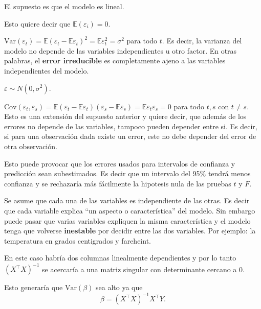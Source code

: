 \documentclass[
  12pt,
]{book}
\providecommand{\tightlist}{%
  \setlength{\itemsep}{0pt}\setlength{\parskip}{0pt}}
\theoremstyle{definition}
\theoremstyle{definition}
\theoremstyle{definition}
\theoremstyle{remark}
\begin{document}
\begin{description}
\tightlist
\item[Independencia lineal]
El supuesto es que el modelo es lineal.
\item[Errores con esperanza nula]
Esto quiere decir que \(\mathbb{E}(\varepsilon_i) = 0\).
\item[Homocedasticidad]
\(\text{Var}(\varepsilon_t) = \mathbb{E}(\varepsilon_t - \mathbb{E} \varepsilon_t)^2 = \mathbb{E} \varepsilon_t^2 = \sigma^2\) para todo \(t\). Es decir, la varianza del modelo no depende de las variables independientes u otro factor. En otras palabras, el \textbf{error irreducible} es completamente ajeno a las variables independientes del modelo.
\item[Normalidad de los residuos]
\(\varepsilon \sim N(0, \sigma^2 )\).
\item[Independencia de los erroes]
\(\text{Cov}(\varepsilon_t,\varepsilon_s ) = \mathbb{E} (\varepsilon_t - \mathbb{E} \varepsilon_t) (\varepsilon_s - \mathbb{E} \varepsilon_s) = \mathbb{E} \varepsilon_t \varepsilon_s = 0\) para todo \(t,s\) con \(t\neq s\). Esto es una extensión del supuesto anterior y quiere decir, que además de los errores no depende de las variables, tampoco pueden depender entre si. Es decir, si para una observación dada existe un error, este no debe depender del error de otra observación.
\end{description}

Esto puede provocar que los errores usados para intervalos de confianza y predicción sean subestimados. Es decir que un intervalo del 95\% tendrá menos confianza y se rechazaría más fácilmente la hipotesis nula de las pruebas \(t\) y \(F\).

\begin{description}
\tightlist
\item[Multicolineaidad]
Se asume que cada una de las variables es independiente de las otras. Es decir que cada variable explica \enquote{un aspecto o característica} del modelo. Sin embargo puede pasar que varias variables expliquen la misma característica y el modelo tenga que volverse \textbf{inestable} por decidir entre las dos variables. Por ejemplo: la temperatura en grados centigrados y fareheint.
\end{description}

En este caso habría dos columnas linealmente dependientes y por lo tanto \((X^{\top}X)^{-1}\) se acercaría a una matriz singular con determinante cercano a 0.

Esto generaría que \(\mathrm{Var}\left(\beta\right)\) sea alto ya que
\begin{equation*}
\beta =  (X^{\top}X)^{-1} X^{\top}Y.
\end{equation*}
\end{document}
